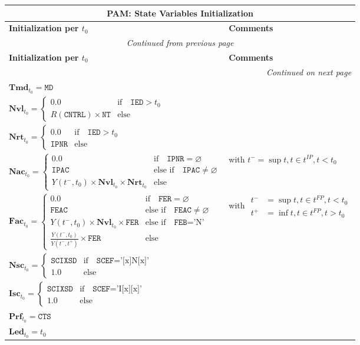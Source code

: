 \documentclass[9pt,oneside]{amsart}
\newenvironment{states}[1]{
	\begin{longtable}[H]{| p{0.5\textwidth} |  p{0.45\textwidth} |}
	\multicolumn{2}{c}{\textbf{#1: State Variables Initialization}}\\
	\hline
	\textbf{Initialization per $t_0$} & \textbf{Comments} \\
	\hline
	\endfirsthead
	\multicolumn{2}{c}{\textit{Continued from previous page}} \\
	\hline
	\textbf{Initialization per $t_0$} & \textbf{Comments} \\
	\hline
	\endhead
	\hline \multicolumn{2}{r}{\textit{Continued on next page}} \\
	\endfoot
	\hline
	\endlastfoot
}{%
	\end{longtable}
}
\newcommand{\svar}[2]{\textbf{#1}_{#2}}
\newcommand{\attr}[1]{\texttt{#1}}
\newcommand{\sgn}{R(\attr{CNTRL})}
\newcommand{\yfr}[2]{Y(#1,#2)}
\newcommand{\undef}{\varnothing}
\begin{document}






\begin{states}{PAM}
	$\svar{Tmd}{t_0} = \attr{MD}$ & \\
	\hline
  	$\svar{Nvl}{t_0} = \begin{cases} 0.0 & \text{if} \quad \attr{IED} > t_0 \\
							\sgn\times\attr{NT} & \text{else} \end{cases}$ & \\
	\hline
	$\svar{Nrt}{t_0} = \begin{cases} 0.0 & \text{if} \quad \attr{IED} > t_0 \\
							\attr{IPNR} & \text{else} \end{cases}$ & \\
  	\hline 
  	$\svar{Nac}{t_0} = \begin{cases} 0.0 & \text{if} \quad \attr{IPNR}=\undef \\
							\attr{IPAC} & \text{else if} \quad \attr{IPAC} \neq \undef \\
							\yfr{t^-}{t_0}\times\svar{Nvl}{t_0}\times\svar{Nrt}{t_0} & \text{else} \end{cases}$ & 
			with $t^- = \sup{t}, t \in t^{IP}, t<t_0$ \\
	\hline
  	$\svar{Fac}{t_0} = \begin{cases} 0.0 & \text{if} \quad \attr{FER}=\undef \\
					\attr{FEAC} & \text{else if} \quad \attr{FEAC} \neq \undef \\
					\yfr{t^-}{t_0}\times\svar{Nvl}{t_0}\times\attr{FER} & \text{else if} \quad \attr{FEB}=\text{'N'} \\
					\frac{\yfr{t^-}{t_0}}{\yfr{t^-}{t^+}}\times\attr{FER} & \text{else} \end{cases}$ & 
			with {$\begin{aligned} t^- &= \sup{t}, t \in t^{FP}, t<t_0 \\
						t^+ &= \inf{t}, t \in t^{FP}, t>t_0 \end{aligned}$} \\
  	\hline
  	$\svar{Nsc}{t_0} = \begin{cases} \attr{SCIXSD} & \text{if} \quad \attr{SCEF}=\text{'[x]N[x]'} \\
					1.0 & \text{else} \end{cases}$ & \\
  	\hline
  	$\svar{Isc}{t_0} = \begin{cases} \attr{SCIXSD} & \text{if} \quad \attr{SCEF}=\text{'I[x][x]'} \\
					1.0 & \text{else} \end{cases}$ & \\
	\hline
  	$\svar{Prf}{t_0} = \attr{CTS}$ &  \\
	\hline
	$\svar{Led}{t_0} = t_0$ & \\
	\hline	
\end{states}
\end{document}

